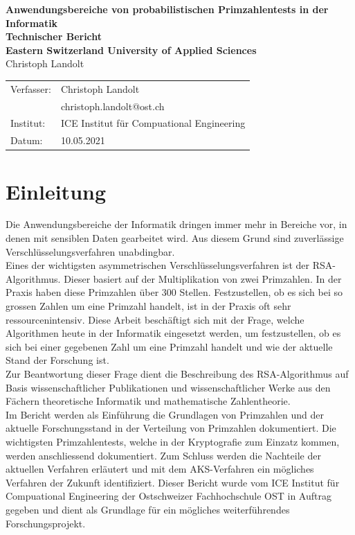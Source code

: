 \documentclass[12pt,a4paper]{article}
\begin{document}

\newpage
\vspace*{2cm}
\begin{center}
\thispagestyle{empty}
{\bf \LARGE Anwendungsbereiche von probabilistischen Primzahlentests in der Informatik}\\[1.5cm]
\vspace*{2cm}
{\bf \large Technischer Bericht\\
Eastern Switzerland University of Applied Sciences}\\[1cm]
{\large Christoph Landolt} \\[3cm]
\vspace*{4cm}
\begin{tabular}{ll}
\hline
{\small Verfasser:} & {\small Christoph Landolt}\\
& {\small christoph.landolt@ost.ch}\\
{\small Institut:} & {\small ICE Institut für Compuational Engineering}\\
{\small Datum:} & {\small 10.05.2021}\\
\hline
\end{tabular}
\end{center}
\newpage


\section{Einleitung}
Die Anwendungsbereiche der Informatik dringen immer mehr in Bereiche vor, in denen mit sensiblen Daten gearbeitet wird. Aus diesem Grund sind zuverlässige Verschlüsselungsverfahren unabdingbar.\\
Eines der wichtigsten asymmetrischen Verschlüsselungsverfahren ist der RSA-Algorithmus. Dieser basiert auf der Multiplikation von zwei Primzahlen. In der Praxis haben diese Primzahlen über 300 Stellen.
Festzustellen, ob es sich bei so grossen Zahlen um eine Primzahl handelt, ist in der Praxis oft sehr ressourcenintensiv. Diese Arbeit beschäftigt sich mit der Frage, welche Algorithmen heute in der Informatik eingesetzt werden, um festzustellen, ob es sich bei einer gegebenen Zahl um eine Primzahl handelt und wie der aktuelle Stand der Forschung ist.\\
Zur Beantwortung dieser Frage dient die Beschreibung des RSA-Algorithmus auf Basis wissenschaftlicher Publikationen und wissenschaftlicher Werke aus den Fächern theoretische Informatik und mathematische Zahlentheorie.\\
Im Bericht werden als Einführung die Grundlagen von Primzahlen und der aktuelle Forschungsstand in der Verteilung von Primzahlen dokumentiert. Die wichtigsten Primzahlentests, welche in der Kryptografie zum Einzatz kommen, werden anschliessend dokumentiert. Zum Schluss werden die Nachteile der aktuellen Verfahren erläutert und mit dem AKS-Verfahren ein mögliches Verfahren der Zukunft identifiziert.
Dieser Bericht wurde vom ICE Institut für Compuational Engineering der Ostschweizer Fachhochschule OST in Auftrag gegeben und dient als Grundlage für ein mögliches weiterführendes Forschungsprojekt.
\newpage
\end{document}
